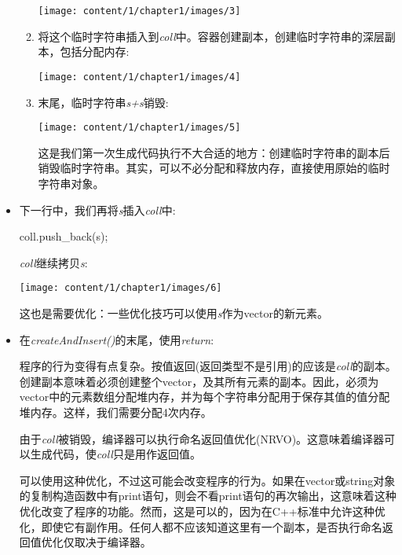 \begin{itemize}
\begin{enumerate}
		\begin{center}
			\texttt{[image: content/1/chapter1/images/3]}
		\end{center}
		\item 将这个临时字符串插入到\textit{coll}中。容器创建副本，创建临时字符串的深层副本，包括分配内存:

		\begin{center}
			\texttt{[image: content/1/chapter1/images/4]}
		\end{center}
		\item 末尾，临时字符串\textit{s+s}销毁:

		\begin{center}
			\texttt{[image: content/1/chapter1/images/5]}
		\end{center}
		这是我们第一次生成代码执行不大合适的地方：创建临时字符串的副本后销毁临时字符串。其实，可以不必分配和释放内存，直接使用原始的临时字符串对象。
	\end{enumerate}
	\item 下一行中，我们再将\textit{s}插入\textit{coll}中:
\begin{cppcode}
coll.push_back(s);
\end{cppcode}
	\textit{coll}继续拷贝\textit{s}:
\begin{center}
		\texttt{[image: content/1/chapter1/images/6]}
	\end{center}
	这也是需要优化：一些优化技巧可以使用\textit{s}作为vector的新元素。
	\item 在\textit{createAndInsert()}的末尾，使用\textit{return}:

	\begin{cppcode}
	return coll;
}
	\end{cppcode}
	程序的行为变得有点复杂。按值返回(返回类型不是引用)的应该是\textit{coll}的副本。创建副本意味着必须创建整个vector，及其所有元素的副本。因此，必须为vector中的元素数组分配堆内存，并为每个字符串分配用于保存其值的值分配堆内存。这样，我们需要分配4次内存。

	由于\textit{coll}被销毁，编译器可以执行命名返回值优化(NRVO)。这意味着编译器可以生成代码，使\textit{coll}只是用作返回值。

	可以使用这种优化，不过这可能会改变程序的行为。如果在vector或string对象的复制构造函数中有print语句，则会不看print语句的再次输出，这意味着这种优化改变了程序的功能。然而，这是可以的，因为在C++标准中允许这种优化，即使它有副作用。任何人都不应该知道这里有一个副本，是否执行命名返回值优化仅取决于编译器。


\end{itemize}
